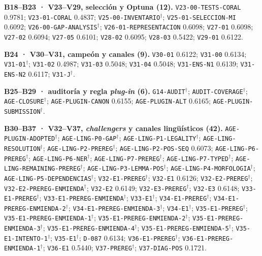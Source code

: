 \documentclass[journal]{IEEEtai}
\begin{document}
\par\medskip\noindent\textbf{B18--B23 · V23--V29, selecci\'on y Optuna (12).} \texttt{V23-00-TESTS-CORAL} 0.9781; \texttt{V23-01-CORAL} 0.4837; \texttt{V25-00-INVENTARIO}$^{\dagger}$; \texttt{V25-01-SELECCION-MI} 0.6092; \texttt{V26-00-GAP-ANALYSIS}$^{\dagger}$; \texttt{V26-01-REPRESENTACION} 0.6098; \texttt{V27-01} 0.6098; \texttt{V27-02} 0.6094; \texttt{V27-05} 0.6101; \texttt{V28-02} 0.6095; \texttt{V28-03} 0.5422; \texttt{V29-01} 0.6122.

\par\medskip\noindent\textbf{B24 · V30--V31, campe\'on y canales (9).} \texttt{V30-01} 0.6122; \texttt{V31-00} 0.6134; \texttt{V31-01}$^{\dagger}$; \texttt{V31-02} 0.4987; \texttt{V31-03} 0.5048; \texttt{V31-04} 0.5048; \texttt{V31-ENS-N1} 0.6139; \texttt{V31-ENS-N2} 0.6117; \texttt{V31-J}$^{\dagger}$.

\par\medskip\noindent\textbf{B25--B29 · auditor\'ia y regla \textit{plug-in} (6).} \texttt{G14-AUDIT}$^{\dagger}$; \texttt{AUDIT-COVERAGE}$^{\dagger}$; \texttt{AGE-CLOSURE}$^{\dagger}$; \texttt{AGE-PLUGIN-CANON} 0.6155; \texttt{AGE-PLUGIN-ALT} 0.6165; \texttt{AGE-PLUGIN-SUBMISSION}$^{\dagger}$.

\par\medskip\noindent\textbf{B30--B37 · V32--V37, \textit{challengers} y canales ling\"u\'isticos (42).} \texttt{AGE-PLUGIN-ADOPTED}$^{\dagger}$; \texttt{AGE-LING-P0-GAP}$^{\dagger}$; \texttt{AGE-LING-P1-LEGALITY}$^{\dagger}$; \texttt{AGE-LING-RESOLUTION}$^{\dagger}$; \texttt{AGE-LING-P2-PREREG}$^{\dagger}$; \texttt{AGE-LING-P2-POS-SEQ} 0.6073; \texttt{AGE-LING-P6-PREREG}$^{\dagger}$; \texttt{AGE-LING-P6-NER}$^{\dagger}$; \texttt{AGE-LING-P7-PREREG}$^{\dagger}$; \texttt{AGE-LING-P7-TYPED}$^{\dagger}$; \texttt{AGE-LING-REMAINING-PREREG}$^{\dagger}$; \texttt{AGE-LING-P3-LEMMA-POS}$^{\dagger}$; \texttt{AGE-LING-P4-MORFOLOGIA}$^{\dagger}$; \texttt{AGE-LING-P5-DEPENDENCIAS}$^{\dagger}$; \texttt{V32-E1-PREREG}$^{\dagger}$; \texttt{V32-E1} 0.6126; \texttt{V32-E2-PREREG}$^{\dagger}$; \texttt{V32-E2-PREREG-ENMIENDA}$^{\dagger}$; \texttt{V32-E2} 0.6149; \texttt{V32-E3-PREREG}$^{\dagger}$; \texttt{V32-E3} 0.6148; \texttt{V33-E1-PREREG}$^{\dagger}$; \texttt{V33-E1-PREREG-ENMIENDA}$^{\dagger}$; \texttt{V33-E1}$^{\dagger}$; \texttt{V34-E1-PREREG}$^{\dagger}$; \texttt{V34-E1-PREREG-ENMIENDA-2}$^{\dagger}$; \texttt{V34-E1-PREREG-ENMIENDA-3}$^{\dagger}$; \texttt{V34-E1}$^{\dagger}$; \texttt{V35-E1-PREREG}$^{\dagger}$; \texttt{V35-E1-PREREG-ENMIENDA-1}$^{\dagger}$; \texttt{V35-E1-PREREG-ENMIENDA-2}$^{\dagger}$; \texttt{V35-E1-PREREG-ENMIENDA-3}$^{\dagger}$; \texttt{V35-E1-PREREG-ENMIENDA-4}$^{\dagger}$; \texttt{V35-E1-PREREG-ENMIENDA-5}$^{\dagger}$; \texttt{V35-E1-INTENTO-1}$^{\dagger}$; \texttt{V35-E1}$^{\dagger}$; \texttt{D-087} 0.6134; \texttt{V36-E1-PREREG}$^{\dagger}$; \texttt{V36-E1-PREREG-ENMIENDA-1}$^{\dagger}$; \texttt{V36-E1} 0.5440; \texttt{V37-PREREG}$^{\dagger}$; \texttt{V37-DIAG-POS} 0.1721.
\end{document}
